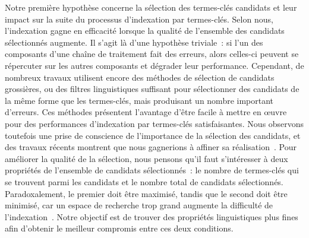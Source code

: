     Notre première hypothèse concerne la sélection des termes-clés candidats et
    leur impact sur la suite du processus d'indexation par termes-clés. Selon
    nous, l'indexation gagne en efficacité lorsque la qualité de l'ensemble des
    candidats sélectionnés augmente.
    Il s'agit là d'une hypothèse triviale~: si l'un des composants d'une chaîne
    de traitement fait des erreurs, alors celles-ci peuvent se répercuter sur
    les autres composants et dégrader leur performance. Cependant, de nombreux
    travaux utilisent encore des méthodes de sélection de candidats grossières,
    ou des filtres linguistiques suffisant pour sélectionner des candidats
    de la même forme que les termes-clés, mais produisant un nombre important 
    d'erreurs. Ces méthodes présentent l'avantage d'être facile à mettre en
    \oe{}uvre pour des performances d'indexation par termes-clés satisfaisantes.
    Nous observons toutefois une prise de conscience de l'importance de la
    sélection des candidats, et des travaux récents montrent que nous gagnerions
    à affiner sa réalisation~\cite{wang2014keyphraseextractionpreprocessing}.
    Pour améliorer la qualité de la sélection, nous pensons qu'il faut
    s'intéresser à deux propriétés de l'ensemble de candidats sélectionnés~: le
    nombre de termes-clés qui se trouvent parmi les candidats et le nombre total
    de candidats sélectionnés. Paradoxalement, le premier doit être maximisé,
    tandis que le second doit être minimisé, car un espace de recherche trop
    grand augmente la difficulté de
    l'indexation~\cite{hasan2014state_of_the_art}.
    Notre objectif est de trouver des propriétés linguistiques plus fines
    afin d'obtenir le meilleur compromis entre ces deux conditions.
    
